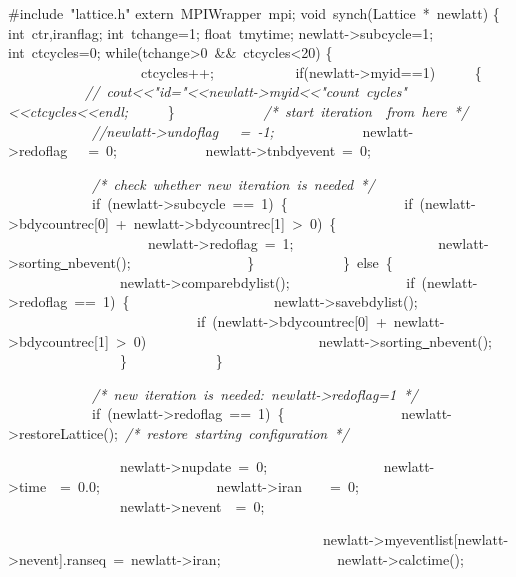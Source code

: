 {\ttfamily \raggedright \footnotesize
\#include\ "{}lattice.h"{}
extern\ MPIWrapper\ mpi;
void\ synch(Lattice\ *\ newlatt)
\{
int\ ctr,iranflag;
int\ tchange=1;
float\ tmytime;
newlatt-{}>{}subcycle=1;
int\ ctcycles=0;
while(tchange>{}0\ \&\&\ ctcycles<{}20)
\{
\ \ \ \ \ \ \ \
\ \ \ \ \ \ \ \ \ \ \ ctcycles++;
\ \ \ \ \ \ \ \ \ \ \ if(newlatt-{}>{}myid==1)
\ \ \ \ \ \{
\ \ \ \ \ \ \ \ \ \ \ \textsl{//\ cout<{}<{}"{}id="{}<{}<{}newlatt-{}>{}myid<{}<{}"{}count\ cycles"{}<{}<{}ctcycles<{}<{}endl;}
\ \ \ \ \ \}
\ \ \ \ \ \ \ \ \ \ \ \ \textsl{/*\ start\ iteration\ \ from\ here\ */}
\ \ \ \ \ \ \ \ \ \ \ \ \textsl{//newlatt-{}>{}undoflag\ \ \ =\ -{}1;}
\ \ \ \ \ \ \ \ \ \ \ \ newlatt-{}>{}redoflag\ \ \ =\ 0;
\ \ \ \ \ \ \ \ \ \ \ \ newlatt-{}>{}tnbdyevent\ =\ 0;
\ \ \ \ \ \ \ \ \ \ \

\ \ \ \ \ \ \ \ \ \ \ \ \textsl{/*\ check\ whether\ new\ iteration\ is\ needed\ */}
\ \ \ \ \ \ \ \ \ \ \ \ if\ (newlatt-{}>{}subcycle\ ==\ 1)\ \{
\ \ \ \ \ \ \ \ \ \ \ \ \ \ \ \ if\ (newlatt-{}>{}bdycountrec[0]\ +\ newlatt-{}>{}bdycountrec[1]\ >{}\ 0)\ \{
\ \ \ \ \ \ \ \ \ \ \ \ \ \ \ \ \ \ \ \ newlatt-{}>{}redoflag\ =\ 1;
\ \ \ \ \ \ \ \ \ \ \ \ \ \ \ \ \ \ \ \ newlatt-{}>{}sorting\underline\ nbevent();
\ \ \ \ \ \ \ \ \ \ \ \ \ \ \ \ \}
\ \ \ \ \ \ \ \ \ \ \ \ \}\ else\ \{
\ \ \ \ \ \ \ \ \ \ \ \ \ \ \ \ newlatt-{}>{}comparebdylist();
\ \ \ \ \ \ \ \ \ \ \ \ \ \ \ \ if\ (newlatt-{}>{}redoflag\ ==\ 1)\ \{
\ \ \ \ \ \ \ \ \ \ \ \ \ \ \ \ \ \ \ \ newlatt-{}>{}savebdylist();
\ \ \ \ \ \ \
\ \ \ \ \ \ \ \ \ \ \ \ \ \ \ \ \ \ \ \ if\ (newlatt-{}>{}bdycountrec[0]\ +\ newlatt-{}>{}bdycountrec[1]\ >{}\ 0)
\ \ \ \ \ \ \ \ \ \ \ \ \ \ \ \ \ \ \ \ \ \ \ \ newlatt-{}>{}sorting\underline\ nbevent();
\ \ \ \ \ \ \ \ \ \ \ \ \ \ \ \ \}
\ \ \ \ \ \ \ \ \ \ \ \ \}

\ \ \ \ \ \ \ \ \ \ \ \ \textsl{/*\ new\ iteration\ is\ needed:\ newlatt-{}>{}redoflag=1\ */}
\ \ \ \ \ \ \ \ \ \ \ \ if\ (newlatt-{}>{}redoflag\ ==\ 1)\ \{
\ \ \ \ \ \ \ \ \ \ \ \ \ \ \ \ newlatt-{}>{}restoreLattice();\ \textsl{/*\ restore\ starting\ configuration\ */}

\ \ \ \ \ \ \ \ \ \ \ \ \ \ \ \ newlatt-{}>{}nupdate\ =\ 0;
\ \ \ \ \ \ \ \ \ \ \ \ \ \ \ \ newlatt-{}>{}time\ \ =\ 0.0;
\ \ \ \ \ \ \ \ \ \ \ \ \ \ \ \ newlatt-{}>{}iran\ \ \ \ =\ 0;
\ \ \ \ \ \ \ \ \ \ \ \ \ \ \ \ newlatt-{}>{}nevent\ \ =\ 0;

\ \ \ \ \ \ \ \ \ \ \ \ \ \ \
\ \ \ \ \ \ \ \ \ \ \ \ \ \
\ \ \ \ \ \ \ \ \ \ \ \ \ \ \ \ newlatt-{}>{}myeventlist[newlatt-{}>{}nevent].ranseq\ =\ newlatt-{}>{}iran;
\ \ \ \ \ \ \ \ \ \ \ \ \ \ \ \ newlatt-{}>{}calctime();

}

